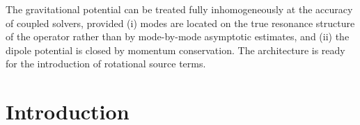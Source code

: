 \documentclass[]{aa}
\begin{document}
{The gravitational potential can be treated fully inhomogeneously at the
accuracy of coupled solvers, provided (i) modes are located on the true
resonance structure of the operator rather than by mode-by-mode asymptotic estimates, and
(ii) the dipole potential is closed by momentum conservation.  The
architecture is ready for the introduction of rotational source terms.}


\maketitle

\section{Introduction}
\label{sec:intro}
\end{document}

